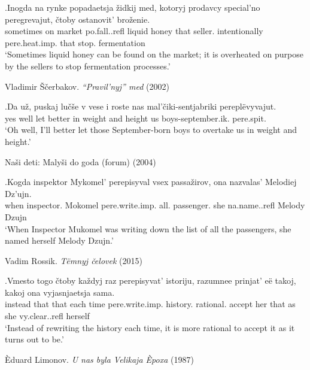 \exg.\label{ex:pere:imp:excess}Inogda na rynke popadaetsja \v{z}idkij med, kotoryj prodavcy special'no peregrevajut, \v{c}toby ostanovit' bro\v{z}enie.\\
sometimes on market po.fall..refl liquid honey that seller. intentionally pere.heat.imp. that stop. fermentation\\
`Sometimes liquid honey can be found on the market; it is overheated on purpose by the sellers to stop fermentation processes.'
\begin{flushright}
\vspace{-0.5em}
Vladimir \v{S}\v{c}erbakov. \textit{``Pravil'nyj'' med }(2002)
\end{flushright}

\exg.\label{ex:pere:imp:compar}Da u\v{z}, puskaj lu\v{c}\v{s}e v vese i roste nas mal'\v{c}iki-sentjabriki perepl\"{e}vyvajut.\\
yes well let better in weight and height us boys-september.ik. pere.spit.\\
\vspace{0.5em}
`Oh well, I'll better let those September-born boys to overtake us in weight and height.'
\begin{flushright}
\vspace{-0.5em}
Na\v{s}i deti: Maly\v{s}i do goda (forum) (2004)
\end{flushright}

\exg.\label{ex:pare:imp:distr}Kogda inspektor Mykomel' perepisyval vsex passa\v{z}irov, ona nazvalas' Melodiej Dz'ujn.\\
when inspector. Mokomel pere.write.imp. all. passenger. she na.name..refl Melody Dzujn\\
`When Inspector Mukomel was writing down the list of all the passengers, she named herself Melody Dzujn.'
\begin{flushright}
\vspace{-0.5em}
Vadim Rossik. \textit{T\"{e}mnyj \v{c}elovek} (2015)
\end{flushright}

\exg.\label{ex:pere:imp:iter}Vmesto togo \v{c}toby ka\v{z}dyj raz perepisyvat' istoriju, razumnee prinjat' e\"{e} takoj, kakoj ona vyjasnjaetsja sama.\\
instead that that each time pere.write.imp. history. rational. accept her that as she vy.clear..refl herself\\
\vspace{0.5em}
`Instead of rewriting the history each time, it is more rational to accept it as it turns out to be.'
\begin{flushright}
\vspace{-0.5em}
\`{E}duard Limonov. \textit{U nas byla Velikaja \`{E}poxa} (1987)
\end{flushright}

